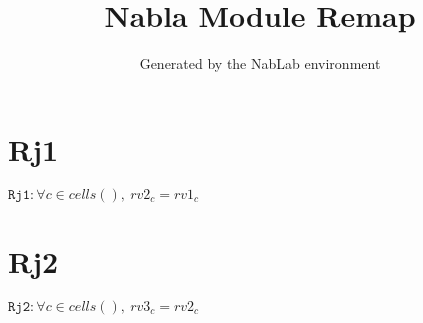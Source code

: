 \documentclass[11pt]{article}
\title{Nabla Module Remap}
\author{Generated by the NabLab environment}
\begin{document}
\maketitle


\section{Rj1}
$\texttt{Rj1} : \forall{c\in cells()}, \ rv2_{c} = rv1_{c}$


\section{Rj2}
$\texttt{Rj2} : \forall{c\in cells()}, \ rv3_{c} = rv2_{c}$
\end{document}
